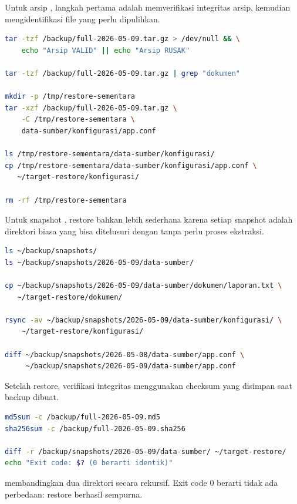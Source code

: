Untuk arsip , langkah pertama adalah memverifikasi integritas arsip,
kemudian mengidentifikasi file yang perlu dipulihkan.

\begin{lstlisting}[language=bash, caption={Restore dari arsip tar dengan verifikasi}]
tar -tzf /backup/full-2026-05-09.tar.gz > /dev/null && \
    echo "Arsip VALID" || echo "Arsip RUSAK"

tar -tzf /backup/full-2026-05-09.tar.gz | grep "dokumen"

mkdir -p /tmp/restore-sementara
tar -xzf /backup/full-2026-05-09.tar.gz \
    -C /tmp/restore-sementara \
    data-sumber/konfigurasi/app.conf

ls /tmp/restore-sementara/data-sumber/konfigurasi/
cp /tmp/restore-sementara/data-sumber/konfigurasi/app.conf \
   ~/target-restore/konfigurasi/

rm -rf /tmp/restore-sementara
\end{lstlisting}

Untuk snapshot , restore bahkan lebih sederhana karena setiap snapshot
adalah direktori biasa yang bisa ditelusuri dengan  tanpa perlu proses
ekstraksi.

\begin{lstlisting}[language=bash, caption={Restore dari snapshot rsync}]
ls ~/backup/snapshots/
ls ~/backup/snapshots/2026-05-09/data-sumber/

cp ~/backup/snapshots/2026-05-09/data-sumber/dokumen/laporan.txt \
   ~/target-restore/dokumen/

rsync -av ~/backup/snapshots/2026-05-09/data-sumber/konfigurasi/ \
    ~/target-restore/konfigurasi/

diff ~/backup/snapshots/2026-05-08/data-sumber/app.conf \
     ~/backup/snapshots/2026-05-09/data-sumber/app.conf
\end{lstlisting}

Setelah restore, verifikasi integritas menggunakan checksum yang disimpan saat
backup dibuat.

\begin{lstlisting}[language=bash, caption={Verifikasi integritas setelah restore}]
md5sum -c /backup/full-2026-05-09.md5
sha256sum -c /backup/full-2026-05-09.sha256

diff -r /backup/snapshots/2026-05-09/data-sumber/ ~/target-restore/
echo "Exit code: $? (0 berarti identik)"
\end{lstlisting}

\cmd{diff -r} membandingkan dua direktori secara rekursif. Exit code 0 berarti
tidak ada perbedaan: restore berhasil sempurna.

